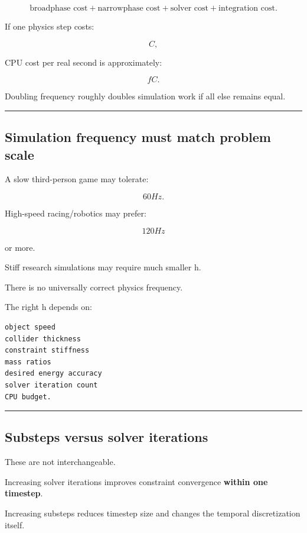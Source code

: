 \[
\text{broadphase cost}
+
\text{narrowphase cost}
+
\text{solver cost}
+
\text{integration cost}.
\]

If one physics step costs:

\[
C,
\]

CPU cost per real second is approximately:

\[
fC.
\]

Doubling frequency roughly doubles simulation work if all else remains equal.

\begin{center}\rule{0.5\linewidth}{0.5pt}\end{center}

\subsection{Simulation frequency must match problem scale}\label{06-engine-ii-ch038-simulation-frequency-must-match-problem-scale}

A slow third-person game may tolerate:

\[
60Hz.
\]

High-speed racing/robotics may prefer:

\[
120Hz
\]

or more.

Stiff research simulations may require much smaller h.

There is no universally correct physics frequency.

The right h depends on:

\begin{verbatim}
object speed
collider thickness
constraint stiffness
mass ratios
desired energy accuracy
solver iteration count
CPU budget.
\end{verbatim}

\begin{center}\rule{0.5\linewidth}{0.5pt}\end{center}

\subsection{Substeps versus solver iterations}\label{06-engine-ii-ch038-substeps-versus-solver-iterations}

These are not interchangeable.

Increasing solver iterations improves constraint convergence \textbf{within one timestep}.

Increasing substeps reduces timestep size and changes the temporal discretization itself.

